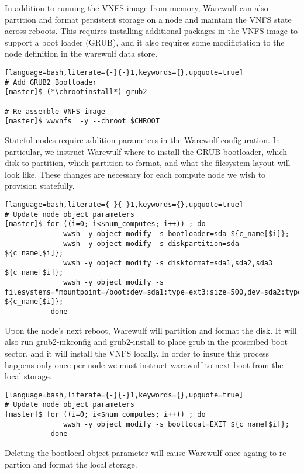 In addition to running the VNFS image from memory, Warewulf can also partition
and format persistent storage on a node and maintain the VNFS state across
reboots. This requires installing additional packages in the VNFS image to
support a boot loader (GRUB), and it also requires some modifictation to the
node definition in the warewulf data store. 

\begin{lstlisting}[language=bash,literate={-}{-}1,keywords={},upquote=true]
# Add GRUB2 Bootloader
[master]$ (*\chrootinstall*) grub2

# Re-assemble VNFS image
[master]$ wwvnfs  -y --chroot $CHROOT
\end{lstlisting}

Stateful nodes require addition parameters in the Warewulf configuration. In
particular, we instruct Warewulf where to install the GRUB bootloader, which
disk to partition, which partition to format, and what the filesystem layout
will look like. These changes are necessary for each compute node we wish to
provision statefully.

\begin{lstlisting}[language=bash,literate={-}{-}1,keywords={},upquote=true]
# Update node object parameters
[master]$ for ((i=0; i<$num_computes; i++)) ; do 
              wwsh -y object modify -s bootloader=sda ${c_name[$i]};
              wwsh -y object modify -s diskpartition=sda ${c_name[$i]};
              wwsh -y object modify -s diskformat=sda1,sda2,sda3 ${c_name[$i]};
              wwsh -y object modify -s filesystems="mountpoint=/boot:dev=sda1:type=ext3:size=500,dev=sda2:type=swap:size=32768,mountpoint=/:dev=sda3:type=ext3:size=fill" ${c_name[$i]};
           done
\end{lstlisting}

Upon the node's next reboot, Warewulf will partition and format the disk. It
will also run grub2-mkconfig and grub2-install to place grub in the proscribed
boot sector, and it will install the VNFS locally. In order to insure this 
process happens only once per node we must instruct warewulf to next boot from 
the local storage.

\begin{lstlisting}[language=bash,literate={-}{-}1,keywords={},upquote=true]
# Update node object parameters
[master]$ for ((i=0; i<$num_computes; i++)) ; do 
              wwsh -y object modify -s bootlocal=EXIT ${c_name[$i]};
           done
\end{lstlisting}

Deleting the bootlocal object parameter will cause Warewulf once againg to
re-partion and format the local storage.
